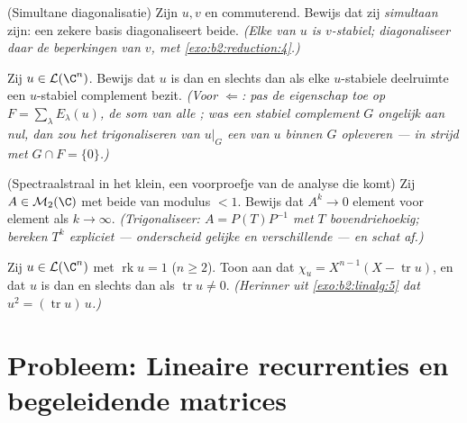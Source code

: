 \begin{exercise}[$\star\star\star$]\label{exo:b2:reduction:9}
(Simultane diagonalisatie) Zijn $u, v$  en
commuterend. Bewijs dat zij \emph{simultaan} 
zijn: een zekere basis diagonaliseert beide. \emph{(Elke
 van $u$ is $v$-stabiel; diagonaliseer daar de
beperkingen van $v$, met \cref{exo:b2:reduction:4}.)}
\end{exercise}

\begin{exercise}[$\star\star\star$]\label{exo:b2:reduction:10}
Zij $u \in \mathcal{L}(\C^n)$. Bewijs dat $u$  is
dan en slechts dan als elke $u$-stabiele deelruimte een
$u$-stabiel complement bezit. \emph{(Voor $\Leftarrow$: pas de
eigenschap toe op $F = \sum_\lambda E_\lambda(u)$, de som van alle
; was een stabiel complement $G$ ongelijk aan nul, dan
zou het trigonaliseren van $u|_G$ een  van $u$ binnen
$G$ opleveren --- in strijd met $G \cap F = \{0\}$.)}
\end{exercise}

\begin{exercise}[$\star\star\star$]\label{exo:b2:reduction:11}
(Spectraalstraal in het klein, een voorproefje van de analyse die
komt) Zij $A \in \mathcal{M}_2(\C)$ met beide  van
modulus $< 1$. Bewijs dat $A^k \to 0$ element voor element als $k
\to \infty$. \emph{(Trigonaliseer: $A = P(T)P^{-1}$ met $T$
bovendriehoekig; bereken $T^k$ expliciet --- onderscheid gelijke en
verschillende  --- en schat af.)}
\end{exercise}

\begin{exercise}[$\star\star$]\label{exo:b2:reduction:12}
Zij $u \in \mathcal{L}(\C^n)$ met $\operatorname{rk} u = 1$ ($n
\geq 2$). Toon aan dat $\chi_u = X^{n-1}(X - \operatorname{tr} u)$,
en dat $u$  is dan en slechts dan als
$\operatorname{tr} u \neq 0$. \emph{(Herinner uit
\cref{exo:b2:linalg:5} dat $u^2 = (\operatorname{tr} u)\,u$.)}
\end{exercise}

\section{Probleem: Lineaire recurrenties en begeleidende matrices}

